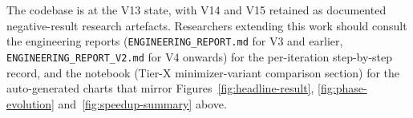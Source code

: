 The codebase is at the V13 state, with V14 and V15 retained as
documented negative-result research artefacts.  Researchers
extending this work should consult the engineering reports
(\texttt{ENGINEERING\_REPORT.md} for V3 and earlier,
\texttt{ENGINEERING\_REPORT\_V2.md} for V4 onwards) for the
per-iteration step-by-step record, and the 
notebook (Tier-X minimizer-variant comparison section) for the
auto-generated charts that mirror Figures~\ref{fig:headline-result},
\ref{fig:phase-evolution} and~\ref{fig:speedup-summary} above.
